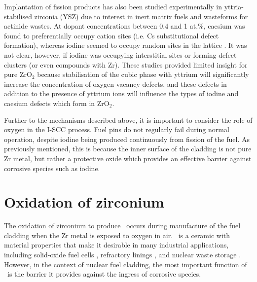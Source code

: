 Implantation of fission products has also been studied experimentally in yttria-stabilised zirconia (YSZ) due to interest in inert matrix fuels and wasteforms for actinide wastes. At dopant concentrations between 0.4 and 1 at.\%, caesium was found to preferentially occupy cation sites (i.e. Cs substitutional defect formation), whereas iodine seemed to occupy random sites in the lattice \cite{Thome1999}. It was not clear, however, if iodine was occupying interstitial sites or forming defect clusters (or even compounds with Zr). These studies provided limited insight for pure ZrO$_{2}$ because stabilisation of the cubic phase with yttrium will significantly increase the concentration of oxygen vacancy defects, and these defects in addition to the presence of yttrium ions will influence the types of iodine and caesium defects which form in ZrO$_{2}$.

Further to the mechanisms described above, it is important to consider the role of oxygen in the I-SCC process. Fuel pins do not regularly fail during normal operation, despite iodine being produced continuously from fission of the fuel. As previously mentioned, this is because the inner surface of the cladding is not pure Zr metal, but rather a protective oxide which provides an effective barrier against corrosive species such as iodine.

\section{Oxidation of zirconium}

The oxidation of zirconium to produce \zirconia\ occurs during manufacture of the fuel cladding when the Zr metal is exposed to oxygen in air. \zirconia\ is a ceramic with material properties that make it desirable in many industrial applications, including solid-oxide fuel cells \cite{radford1979zirconia}, refractory linings \cite{whittemore1952fused}, and nuclear waste storage \cite{wang2012ceramics}. However, in the context of nuclear fuel cladding, the most important function of \zirconia\ is the barrier it provides against the ingress of corrosive species. 

